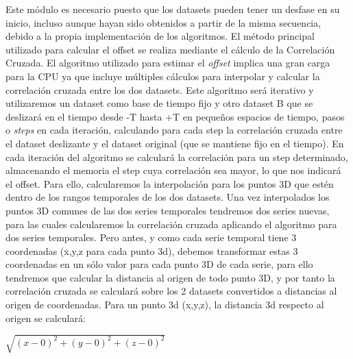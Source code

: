 Este módulo es necesario puesto que los datasets pueden tener un desfase en su inicio, incluso aunque hayan sido obtenidos a partir de la misma secuencia, debido a la propia implementación de los algoritmos. El método principal utilizado para calcular el offset se realiza mediante el cálculo de la Correlación Cruzada. 
El algoritmo utilizado para estimar el \textit{offset} implica una gran carga para la CPU ya que incluye múltiples cálculos para interpolar y calcular la correlación cruzada entre los dos datasets. Este algoritmo será iterativo y utilizaremos un dataset como base de tiempo fijo y otro dataset B que se deslizará en el tiempo desde -T hasta +T en pequeños espacios de tiempo, pasos o \textit{steps} en cada iteración, calculando para cada step la correlación cruzada entre el dataset deslizante y el dataset original (que se mantiene fijo en el tiempo). 
En cada iteración del algoritmo se calculará la correlación para un step determinado, almacenando el memoria el step cuya correlación sea mayor, lo que nos indicará el offset. Para ello, calcularemos la interpolación para los puntos 3D que estén dentro de los rangos temporales de los dos datasets. Una vez interpolados los puntos 3D comunes de las dos series temporales tendremos dos series nuevas, para las cuales calcularemos la correlación cruzada aplicando el algoritmo para dos series temporales. Pero antes, y como cada serie temporal tiene 3 coordenadas (x,y,z para cada punto 3d), debemos transformar estas 3 coordenadas en un sólo valor para cada punto 3D de cada serie, para ello tendremos que calcular la distancia al origen de todo punto 3D, y por tanto la correlación cruzada se calculará sobre los 2 datasets convertidos a distancias al origen de coordenadas.
Para un punto 3d (x,y,z), la distancia 3d respecto al origen se calculará:
\begin{center}
	\begin{math}
	\sqrt{(x-0)^2 +(y-0)^2+(z-0)^2}
	\end{math}
\end{center}

